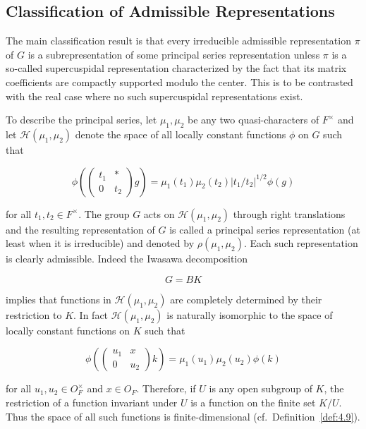 \subsection{Classification of Admissible Representations}

The main classification result is that every irreducible admissible representation $\pi$ of $G$ is a subrepresentation of some principal series representation unless $\pi$ is a so-called supercuspidal representation characterized by the fact that its matrix coefficients are compactly supported modulo the center. This is to be contrasted with the real case where no such supercuspidal representations exist.

To describe the principal series, let $\mu_1, \mu_2$ be any two quasi-characters of $F^{\times}$ and let $\mathcal{H}(\mu_1, \mu_2)$ denote the space of all locally constant functions $\phi$ on $G$ such that

\begin{equation}\label{eq:4.9}
\phi\!\left(\begin{pmatrix} t_1 & * \\ 0 & t_2 \end{pmatrix} g\right) = \mu_1(t_1)\mu_2(t_2)|t_1/t_2|^{1/2}\phi(g)\tag{4.9}
\end{equation}

for all $t_1, t_2 \in F^{\times}$. The group $G$ acts on $\mathcal{H}(\mu_1, \mu_2)$ through right translations and the resulting representation of $G$ is called a principal series representation (at least when it is irreducible) and denoted by $\rho(\mu_1, \mu_2)$. Each such representation is clearly admissible. Indeed the Iwasawa decomposition

\begin{equation}\label{eq:4.10}
G = BK\tag{4.10}
\end{equation}

implies that functions in $\mathcal{H}(\mu_1, \mu_2)$ are completely determined by their restriction to $K$. In fact $\mathcal{H}(\mu_1, \mu_2)$ is naturally isomorphic to the space of locally constant functions on $K$ such that

\[
\phi\!\left(\begin{pmatrix} u_1 & x \\ 0 & u_2 \end{pmatrix} k\right) = \mu_1(u_1)\mu_2(u_2)\phi(k)
\]

for all $u_1, u_2 \in O_F^{\times}$ and $x \in O_F$. Therefore, if $U$ is any open subgroup of $K$, the restriction of a function invariant under $U$ is a function on the finite set $K/U$. Thus the space of all such functions is finite-dimensional (cf.\ Definition~\ref{def:4.9}).

